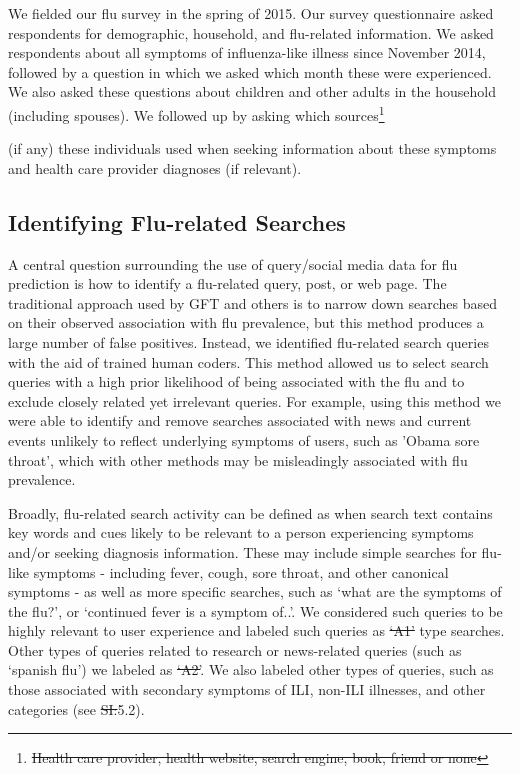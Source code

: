 \documentclass[fleqn,10pt]{wlscirep}
\providecommand{\DIFadd}[1]{{\protect\color{blue}\uwave{#1}}} %
\providecommand{\DIFdel}[1]{{\protect\color{red}\sout{#1}}}                      %
\providecommand{\DIFaddbegin}{} %
\providecommand{\DIFaddend}{} %
\providecommand{\DIFdelbegin}{} %
\providecommand{\DIFdelend}{} %
\begin{document}
We fielded our flu survey in the spring of 2015. Our survey questionnaire asked respondents for demographic, household, and flu-related information. We asked respondents about all symptoms of influenza-like illness since November 2014, followed by a question in which we asked which month these were experienced. We also asked these questions about children and other adults in the household (including spouses). We followed up by asking which sources\DIFdelbegin \footnote{\DIFdel{Health care provider, health website, search engine, book, friend or none}} %
\addtocounter{footnote}{-1}%
\DIFdelend \DIFaddbegin {} \DIFaddend (if any) these individuals used when seeking information about these symptoms and health care provider diagnoses (if relevant).

\subsection*{Identifying Flu-related Searches}

A central question surrounding the use of query/social media data for flu prediction is how to identify a flu-related query, post, or web page. The traditional approach used by GFT and others is to narrow down searches based on their observed association with flu prevalence, but this method produces a large number of false positives. Instead, we identified flu-related search queries with the aid of trained human coders. This method allowed us to select search queries with a high prior likelihood of being associated with the flu and to exclude closely related yet irrelevant queries. For example, using this method we were able to identify and remove searches associated with news and current events unlikely to reflect underlying symptoms of users, such as 'Obama sore throat', which with other methods may be misleadingly associated with flu prevalence. 

Broadly, flu-related search activity can be defined as when search text contains key words and cues likely to be relevant to a person experiencing symptoms and/or seeking diagnosis information. These may include simple searches for flu-like symptoms - including fever, cough, sore throat, and other canonical symptoms - as well as more specific searches, such as `what are the symptoms of the flu?', or `continued fever is a symptom of..'. We considered such queries to be highly relevant to user experience and labeled such queries as \DIFdelbegin \DIFdel{`A1' }\DIFdelend \DIFaddbegin \emph{\DIFadd{A1}} \DIFaddend type searches. Other types of queries related to research or news-related queries (such as `spanish flu') we labeled as \DIFdelbegin \DIFdel{`A2'}\DIFdelend \DIFaddbegin \emph{\DIFadd{A2}}\DIFaddend . We also labeled other types of queries, such as those associated with secondary symptoms of ILI, non-ILI illnesses, and other categories (see \DIFdelbegin \DIFdel{SI:}\DIFdelend \DIFaddbegin \DIFadd{Supplementary Information }\DIFaddend 5.2). 
\end{document}

